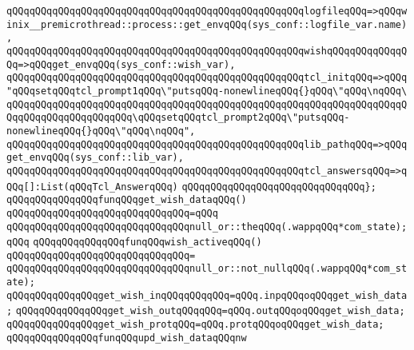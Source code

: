 \verb|qQQqqQQqqQQqqQQqqQQqqQQqqQQqqQQqqQQqqQQqqQQqqQQqqQQqlogfileqQQq=>qQQqwinix__premicrothread::process::get_envqQQq(sys_conf::logfile_var.name),|\newline
\verb|qQQqqQQqqQQqqQQqqQQqqQQqqQQqqQQqqQQqqQQqqQQqqQQqqQQqwishqQQqqQQqqQQqqQQq=>qQQqget_envqQQq(sys_conf::wish_var),|\newline
\newline
\verb|qQQqqQQqqQQqqQQqqQQqqQQqqQQqqQQqqQQqqQQqqQQqqQQqqQQqtcl_initqQQq=>qQQq"qQQqsetqQQqtcl_prompt1qQQq\"putsqQQq-nonewlineqQQq{}qQQq\"qQQq\nqQQq\|\newline
\verb|qQQqqQQqqQQqqQQqqQQqqQQqqQQqqQQqqQQqqQQqqQQqqQQqqQQqqQQqqQQqqQQqqQQqqQQqqQQqqQQqqQQqqQQqqQQq\qQQqsetqQQqtcl_prompt2qQQq\"putsqQQq-nonewlineqQQq{}qQQq\"qQQq\nqQQq",|\newline
\newline
\verb|qQQqqQQqqQQqqQQqqQQqqQQqqQQqqQQqqQQqqQQqqQQqqQQqqQQqlib_pathqQQq=>qQQqget_envqQQq(sys_conf::lib_var),|\newline
\newline
\verb|qQQqqQQqqQQqqQQqqQQqqQQqqQQqqQQqqQQqqQQqqQQqqQQqqQQqtcl_answersqQQq=>qQQq[]:List(qQQqTcl_AnswerqQQq)|\newline
\verb|qQQqqQQqqQQqqQQqqQQqqQQqqQQqqQQq};|\newline
\newline
\newline
\verb|qQQqqQQqqQQqqQQqfunqQQqget_wish_dataqQQq()|\newline
\verb|qQQqqQQqqQQqqQQqqQQqqQQqqQQqqQQq=qQQq|\newline
\verb|qQQqqQQqqQQqqQQqqQQqqQQqqQQqqQQqnull_or::theqQQq(.wappqQQq*com_state);qQQq|\newline
\newline
\verb|qQQqqQQqqQQqqQQqfunqQQqwish_activeqQQq()|\newline
\verb|qQQqqQQqqQQqqQQqqQQqqQQqqQQqqQQq=|\newline
\verb|qQQqqQQqqQQqqQQqqQQqqQQqqQQqqQQqnull_or::not_nullqQQq(.wappqQQq*com_state);|\newline
\newline
\verb|qQQqqQQqqQQqqQQqget_wish_inqQQqqQQqqQQq=qQQq.inpqQQqoqQQqget_wish_data;|\newline
\verb|qQQqqQQqqQQqqQQqget_wish_outqQQqqQQq=qQQq.outqQQqoqQQqget_wish_data;|\newline
\verb|qQQqqQQqqQQqqQQqget_wish_protqQQq=qQQq.protqQQqoqQQqget_wish_data;|\newline
\newline
\verb|qQQqqQQqqQQqqQQqfunqQQqupd_wish_dataqQQqnw|\newline
